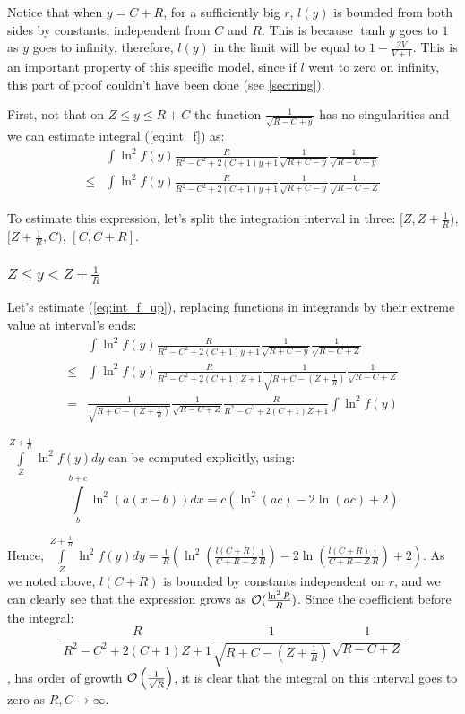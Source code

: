 Notice that when $y = C + R$, for a sufficiently big $r$, $l(y)$ is bounded from both sides by constants, independent from $C$ and $R$. This is because $\tanh y$ goes to $1$ as $y$ goes to infinity, therefore, $l(y)$ in the limit will be equal to $1 - \frac{2 V}{V + 1}$. This is an important property of this specific model, since if $l$ went to zero on infinity, this part of proof couldn't have been done (see \autoref{sec:ring}).

First, not that on $Z \le y \le R + C$ the function $\frac{1}{\sqrt{R - C + y}}$ has no singularities and we can estimate integral (\ref{eq:int_f}) as:
\begin{equation}\label{eq:int_f_up}
\begin{aligned}
       & \int \ln^2 f(y) \frac{R}{R^2 - C^2 + 2 (C + 1) y + 1} \frac{1}{\sqrt{R + C - y}} \frac{1}{\sqrt{R - C + y}}
\\ \le & \int \ln^2 f(y) \frac{R}{R^2 - C^2 + 2 (C + 1) y + 1} \frac{1}{\sqrt{R + C - y}} \frac{1}{\sqrt{R - C + Z}} 
\end{aligned}
\end{equation}

To estimate this expression, let's split the integration interval in three: $[Z, Z + \frac{1}{R})$, $[Z + \frac{1}{R}, C)$, $[C, C + R]$.

\subsubsection{$Z \le y < Z + \frac{1}{R}$}

Let's estimate (\ref{eq:int_f_up}), replacing functions in integrands by their extreme value at interval's ends:
\begin{align*}
       & \int \ln^2 f(y) \frac{R}{R^2 - C^2 + 2 (C + 1) y + 1} \frac{1}{\sqrt{R + C - y}} \frac{1}{\sqrt{R - C + Z}}
\\ \le & \int \ln^2 f(y) \frac{R}{R^2 - C^2 + 2 (C + 1) Z + 1} \frac{1}{\sqrt{R + C - (Z + \frac{1}{R})}} \frac{1}{\sqrt{R - C + Z}}
\\ =   & \frac{1}{\sqrt{R + C - (Z + \frac{1}{R})}} \frac{1}{\sqrt{R - C + Z}} \frac{R}{R^2 - C^2 + 2 (C + 1) Z + 1} \int \ln^2 f(y) 
\end{align*}

$\int\limits_{Z}^{Z + \frac{1}{R}} \ln^2 f(y) dy$ can be computed explicitly, using:
\[
    \int\limits_b^{b + c} \ln^2 (a (x - b)) dx = c (\ln^2(a c) - 2 \ln (a c) + 2)
\]

Hence, $\int\limits_{Z}^{Z + \frac{1}{R}} \ln^2 f(y) dy = \frac{1}{R} ( \ln^2 (\frac{l(C + R)}{C + R - Z} \frac{1}{R}) - 2 \ln (\frac{l(C + R)}{C + R - Z} \frac{1}{R}) + 2)$. As we noted above, $l(C + R)$ is bounded by constants independent on $r$, and we can clearly see that the expression grows as $\mcO(\frac{\ln^2 R}{R})$. Since the coefficient before the integral:
\[
\frac{R}{R^2 - C^2 + 2 (C + 1) Z + 1} \frac{1}{\sqrt{R + C - (Z + \frac{1}{R})}} \frac{1}{\sqrt{R - C + Z}}
\]
, has order of growth $\mcO\left(\frac{1}{\sqrt{R}}\right)$, it is clear that the integral on this interval goes to zero as $R, C \to \infty$.

